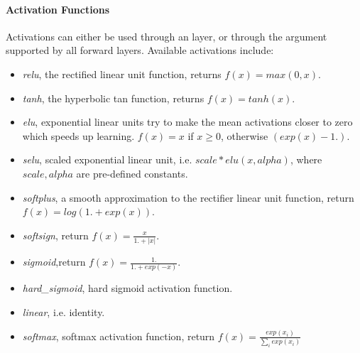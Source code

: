 \paragraph{Activation Functions}
\label{activationsDNN}
Activations can either be used through an  layer, or through the
 argument supported by all forward layers.
Available activations include:
\begin{itemize}
  \item \textit{relu}, the rectified linear unit function, returns $f(x) = max(0, x)$.
  \item \textit{tanh}, the hyperbolic tan function, returns $f(x) = tanh(x)$.
  \item \textit{elu}, exponential linear units try to make the mean activations closer to zero which speeds
    up learning. $f(x) = x$ if $x \ge 0$, otherwise $(exp(x) - 1.)$.
  \item \textit{selu}, scaled exponential linear unit, i.e. $scale * elu(x, alpha)$, where $scale, alpha$
    are pre-defined constants.
  \item \textit{softplus}, a smooth approximation to the rectifier linear unit function, return
    $f(x) = log(1. + exp(x))$.
  \item \textit{softsign}, return $f(x) = \frac{x}{1. + |x|}$.
  \item \textit{sigmoid},return $f(x) = \frac{1.}{1. + exp(-x)}$.
  \item \textit{hard\_sigmoid}, hard sigmoid activation function.
  \item \textit{linear}, i.e. identity.
  \item \textit{softmax}, softmax activation function, return $f(x) = \frac{exp(x_i)}{\sum_i{exp(x_i)}}$
\end{itemize}

